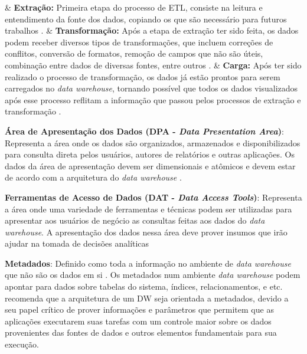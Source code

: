 \begin{easylist}[itemize]

	& \textbf{Extração: } Primeira etapa do processo de ETL, consiste na leitura e entendimento da fonte 		dos dados, copiando os que são necessário para futuros trabalhos \cite{Kimball2002}.  
	& \textbf{Transformação: } Após a etapa de extração ter sido feita, os dados podem receber diversos tipos de transformações, que incluem correções de conflitos, conversão de formatos, remoção de campos que não são úteis, combinação entre dados de diversas fontes, entre outros \cite{Kimball2002}.
	& \textbf{Carga: } Após ter sido realizado o processo de transformação, os dados já estão prontos para serem carregados no \textit{data warehouse}, tornando possível que todos os dados visualizados após esse processo reflitam a informação que passou pelos processos de extração e transformação \cite{neeraj_sharma_2011}.  

	\end{easylist}


\textbf{Área de Apresentação dos Dados (DPA - \textit{Data Presentation Area})}:
Representa a área onde os dados são organizados, armazenados e disponibilizados para consulta direta pelos usuários, autores de relatórios e outras aplicações. Os dados da área de apresentação devem ser dimensionais e atômicos e devem estar de acordo com a arquitetura do \textit{data warehouse} \cite{Kimball2002}.


\textbf{Ferramentas de Acesso de Dados (DAT - \textit{Data Access Tools})}:
Representa a área onde uma variedade de ferramentas e técnicas podem ser utilizadas para apresentar aos usuários de negócio as consultas feitas aos dados do \textit{data warehouse}. A apresentação dos dados nessa área deve prover insumos que irão ajudar na tomada de decisões analíticas \cite{Kimball2002}

\textbf{Metadados}: Definido como toda a informação no ambiente de \textit{data warehouse} que não são os dados em si \cite{Kimball2002}. Os metadados num ambiente \textit{data warehouse} podem apontar para dados sobre tabelas do sistema, índices, relacionamentos, e etc.  recomenda que a arquitetura de um DW seja orientada a metadados, devido a seu papel crítico de prover informações e parâmetros que permitem que as aplicações executarem suas tarefas com um controle maior sobre os dados provenientes das fontes de dados e outros elementos fundamentais para sua execução.


